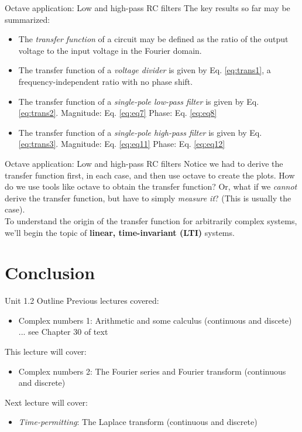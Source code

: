 \documentclass{beamer}
\begin{document}
\begin{frame}{Octave application: Low and high-pass RC filters}
\small
The key results so far may be summarized:
\begin{itemize}
\item The \textit{transfer function} of a circuit may be defined as the ratio of the output voltage to the input voltage in the Fourier domain.
\item The transfer function of a \textit{voltage divider} is given by Eq. \ref{eq:trans1}, a frequency-independent ratio with no phase shift.
\item The transfer function of a \textit{single-pole low-pass filter} is given by Eq. \ref{eq:trans2}.  Magnitude: Eq. \ref{eq:eq7} Phase: Eq. \ref{eq:eq8}
\item The transfer function of a \textit{single-pole high-pass filter} is given by Eq. \ref{eq:trans3}.  Magnitude: Eq. \ref{eq:eq11} Phase: Eq. \ref{eq:eq12}
\end{itemize}
\end{frame}

\begin{frame}{Octave application: Low and high-pass RC filters}
Notice we had to derive the transfer function first, in each case, and then use octave to create the plots.  How do we use tools like octave to obtain the transfer function?  Or, what if we \textit{cannot} derive the transfer function, but have to simply \textit{measure it}?  (This is usually the case). \\ \vspace{0.5cm}
To understand the origin of the transfer function for arbitrarily complex systems, we'll begin the topic of \textbf{linear, time-invariant (LTI)} systems.
\end{frame}

\section{Conclusion}

\begin{frame}{Unit 1.2 Outline}
Previous lectures covered:
\begin{itemize}
\item Complex numbers 1: Arithmetic and some calculus (continuous and discete) ... see Chapter 30 of text
\end{itemize}
This lecture will cover:
\begin{itemize}
\item \alert{Complex numbers 2: The Fourier series and Fourier transform (continuous and discrete)}
\end{itemize}
Next lecture will cover:
\begin{itemize}
\item \textit{Time-permitting}: The Laplace transform (continuous and discrete)
\end{itemize}
\end{frame}
\end{document}
